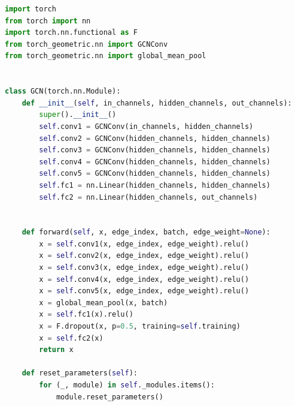 \documentclass{article}
\begin{document}
\begin{lstlisting}[language=Python]
import torch
from torch import nn
import torch.nn.functional as F
from torch_geometric.nn import GCNConv
from torch_geometric.nn import global_mean_pool


class GCN(torch.nn.Module):
    def __init__(self, in_channels, hidden_channels, out_channels):
        super().__init__()
        self.conv1 = GCNConv(in_channels, hidden_channels)
        self.conv2 = GCNConv(hidden_channels, hidden_channels)
        self.conv3 = GCNConv(hidden_channels, hidden_channels)
        self.conv4 = GCNConv(hidden_channels, hidden_channels)
        self.conv5 = GCNConv(hidden_channels, hidden_channels)
        self.fc1 = nn.Linear(hidden_channels, hidden_channels)
        self.fc2 = nn.Linear(hidden_channels, out_channels)


    def forward(self, x, edge_index, batch, edge_weight=None):
        x = self.conv1(x, edge_index, edge_weight).relu()
        x = self.conv2(x, edge_index, edge_weight).relu()
        x = self.conv3(x, edge_index, edge_weight).relu()
        x = self.conv4(x, edge_index, edge_weight).relu()
        x = self.conv5(x, edge_index, edge_weight).relu()
        x = global_mean_pool(x, batch)
        x = self.fc1(x).relu()
        x = F.dropout(x, p=0.5, training=self.training)
        x = self.fc2(x)
        return x
    
    def reset_parameters(self):
        for (_, module) in self._modules.items():
            module.reset_parameters()

\end{lstlisting}
\end{document}
